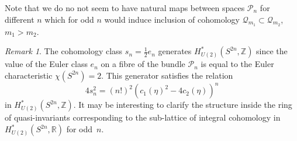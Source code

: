 \documentclass[11pt]{amsart}
\theoremstyle{definition}
\theoremstyle{remark}
\newtheorem{remark}[theorem]{Remark}
\numberwithin{equation}{section}
\newcommand{\CP}{\mathbb{CP}}
\begin{document}
Note that we do no not seem to have natural maps between spaces $\mathcal P_n$ for different $n$ which for odd $n$ would induce inclusion of cohomology $\mathcal Q_{m_1} \subset \mathcal Q_{m_2}$, $m_1>m_2$. 



    






\begin{remark}
The cohomology class $s_n=\frac12 e_n$ generates $H^*_{U(2)}(S^{2n},\mathbb{Z})$ since the value of the Euler class $e_n$ on a fibre of the bundle $\mathcal P_n$ is equal to the Euler characteristic $\chi(S^{2n})=2$.  This generator satisfies the  relation 
\[
4 s_n^2={(n!)^2}(c_1(\eta)^2-4c_2(\eta))^n
\]
in $H^*_{U(2)}(S^{2n},\mathbb{Z})$.
It may be interesting to clarify the structure inside the ring of quasi-invariants corresponding to the sub-lattice of integral cohomology in $H^*_{U(2)}(S^{2n},\mathbb{R})$ for odd~$n$.
\end{remark}
\end{document}
